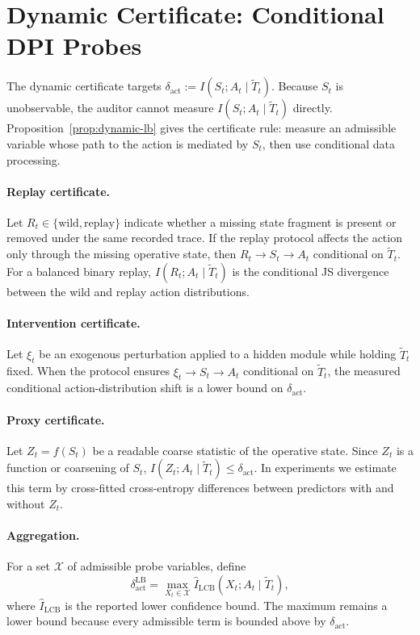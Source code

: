   \section{Dynamic Certificate: Conditional DPI Probes}
  \label{sec:dynamic-cert}

  The dynamic certificate targets $\delta_\text{act} := I(S_t; A_t \mid \tilde
  T_t)$. Because $S_t$ is unobservable, the auditor cannot measure
  $I(S_t; A_t \mid \tilde T_t)$ directly. Proposition~\ref{prop:dynamic-lb}
  gives the certificate rule: measure an admissible variable whose path to the
  action is mediated by $S_t$, then use conditional data processing.

  \paragraph{Replay certificate.}
  Let $R_t\in\{\mathrm{wild},\mathrm{replay}\}$ indicate whether a missing state
  fragment is present or removed under the same recorded trace. If the replay
  protocol affects the action only through the missing operative state, then
  $R_t\to S_t\to A_t$ conditional on $\tilde T_t$. For a balanced binary replay,
  $I(R_t;A_t\mid\tilde T_t)$ is the conditional JS divergence
  between the wild and replay action distributions.

  \paragraph{Intervention certificate.}
  Let $\xi_t$ be an exogenous perturbation applied to a hidden module while
  holding $\tilde T_t$ fixed. When the protocol ensures
  $\xi_t\to S_t\to A_t$ conditional on $\tilde T_t$, the measured conditional
  action-distribution shift is a lower bound on $\delta_\text{act}$.

  \paragraph{Proxy certificate.}
  Let $Z_t=f(S_t)$ be a readable coarse statistic of the operative state. Since
  $Z_t$ is a function or coarsening of $S_t$,
  $I(Z_t;A_t\mid\tilde T_t)\leq\delta_\text{act}$. In experiments we estimate
  this term by cross-fitted cross-entropy differences between predictors with
  and without $Z_t$.

  \paragraph{Aggregation.}
  For a set $\mathcal X$ of admissible probe variables, define
  \[
    \delta_\text{act}^\text{LB}
    =
    \max_{X_t\in\mathcal X}
    \widehat I_\text{LCB}(X_t;A_t\mid\tilde T_t),
  \]
  where $\widehat I_\text{LCB}$ is the reported lower confidence bound. The
  maximum remains a lower bound because every admissible term is bounded above
  by $\delta_\text{act}$.

